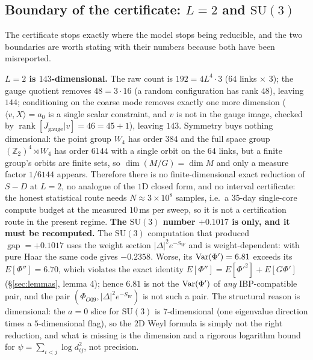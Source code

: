 
\subsection{Boundary of the certificate: $L=2$ and $\mathrm{SU}(3)$}

The certificate stops exactly where the model stops being reducible, and the two boundaries are
worth stating with their numbers because both have been misreported.

\textbf{$L=2$ is $143$-dimensional.} The raw count is $192=4L^{4}\cdot3$ ($64$ links $\times$ $3$);
the gauge quotient removes $48=3\cdot16$ (a random configuration has rank $48$), leaving
$144$; conditioning on the coarse mode removes exactly one more dimension ($\langle v,X\rangle=a_0$
is a single scalar constraint, and $v$ is not in the gauge image, checked by
$\operatorname{rank}[J_{\text{gauge}}|v]=46=45+1$), leaving $143$. Symmetry buys nothing
dimensional: the point group $W_4$ has order $384$ and the full space group
$(\mathbb{Z}_2)^{4}\rtimes W_4$ has order $6144$ with a single orbit on the $64$ links, but a
finite group's orbits are finite sets, so $\dim(M/G)=\dim M$ and only a measure factor $1/6144$
appears. \LT{} Therefore there is no finite-dimensional exact reduction of $S-D$ at $L=2$, no
analogue of the $1$D closed form, and no interval certificate: the honest statistical route needs
$N\approx3\times10^{8}$ samples, i.e.\ a $35$-day single-core compute budget at the measured
$10$\,ms per sweep, so it is not a certification route in the present regime. \LT{}
\textbf{The $\mathrm{SU}(3)$ number $+0.1017$ is \LE{} only, and it must be recomputed.} The
$\mathrm{SU}(3)$ computation that produced $\operatorname{gap}=+0.1017$ uses the weight section
$|\Delta|^{2}e^{-S_W}$ and is weight-dependent: with pure Haar the same code gives $-0.2358$. \LC{}
Worse, its $\operatorname{Var}(\Phi')=6.81$ exceeds its $E[\Phi'']=6.70$, which violates the exact identity
$E[\Phi'']=E[\Phi'^{2}]+E[G\Phi']$ (\S\ref{sec:lemmas}, lemma 4); hence $6.81$ is not the
$\operatorname{Var}(\Phi')$ of \emph{any} IBP-compatible pair, and the pair $(\Phi_{O09},|\Delta|^{2}e^{-S_W})$
is not such a pair. \LT{} The structural reason is dimensional: the $a=0$ slice for
$\mathrm{SU}(3)$ is $7$-dimensional (one eigenvalue direction times a $5$-dimensional flag), so the
$2$D Weyl formula is simply not the right reduction, and what is missing is the dimension and a
rigorous logarithm bound for $\psi=\sum_{i<j}\log d_{ij}^{2}$, not precision.

